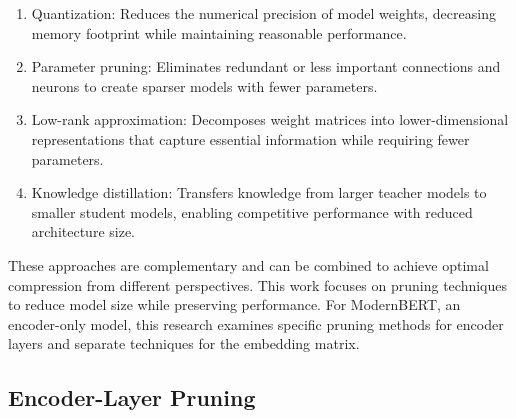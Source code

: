 \documentclass[twocolumn]{article}
\begin{document}
\begin{enumerate}
    \item Quantization: Reduces the numerical precision of model weights, decreasing memory footprint while maintaining reasonable performance.
    \item Parameter pruning: Eliminates redundant or less important connections and neurons to create sparser models with fewer parameters.
    \item Low-rank approximation: Decomposes weight matrices into lower-dimensional representations that capture essential information while requiring fewer parameters.
    \item Knowledge distillation: Transfers knowledge from larger teacher models to smaller student models, enabling competitive performance with reduced architecture size.
\end{enumerate}
These approaches are complementary and can be combined to achieve optimal compression from different perspectives. 
This work focuses on pruning techniques to reduce model size while preserving performance.
For ModernBERT, an encoder-only model, this research examines specific pruning methods for encoder layers and separate techniques for the embedding matrix.


\subsection{Encoder-Layer Pruning}
\end{document}
